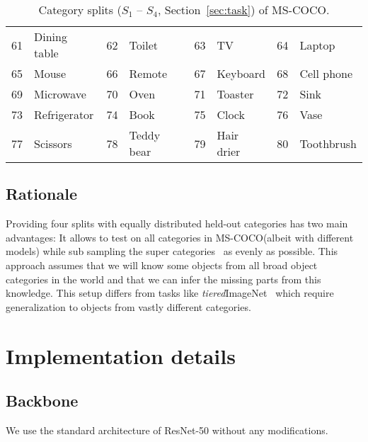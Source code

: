 \documentclass{article}
\newcommand{\coco}{MS-COCO\xspace}
\begin{document}
\begin{table}[h]
\begin{tabular}{rl|rl|rl|rl}
61      & Dining table      & 62     & Toilet            & 63     & TV                & 64     & Laptop            \\
65      & Mouse             & 66     & Remote            & 67     & Keyboard          & 68     & Cell phone        \\
69      & Microwave         & 70     & Oven              & 71     & Toaster           & 72     & Sink              \\
73      & Refrigerator      & 74     & Book              & 75     & Clock             & 76     & Vase              \\
77      & Scissors          & 78     & Teddy bear        & 79     & Hair drier        & 80     & Toothbrush       
\end{tabular}
\caption{Category splits ($S_1$ -- $S_4$, Section~\ref{sec:task}) of \coco.}
\label{table:dataset_splits}
\end{table}

\subsection{Rationale}

Providing four splits with equally distributed held-out categories has two main advantages: It allows to test on all categories in \coco (albeit with different models) while sub sampling the super categories~\cite{Lin2014} as evenly as possible. This approach assumes that we will know some objects from all broad object categories in the world and that we can infer the missing parts from this knowledge. This setup differs from tasks like \emph{tiered}ImageNet~\cite{Ren2018} which require generalization to objects from vastly different categories.

\section{Implementation details}
\label{appendix:implementation}

\subsection{Backbone}
We use the standard architecture of ResNet-50 \cite{He2016} without any modifications.
\end{document}
